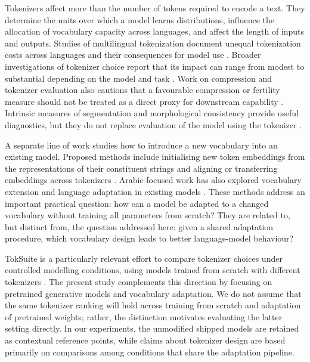 \documentclass[a4paper,fleqn]{cas-sc}
\begin{document}
Tokenizers affect more than the number of tokens required to encode a text. They determine the units over which a model learns distributions, influence the allocation of vocabulary capacity across languages, and affect the length of inputs and outputs. Studies of multilingual tokenization document unequal tokenization costs across languages and their consequences for model use \citep{rust2021good,petrov2023language}. Broader investigations of tokenizer choice report that its impact can range from modest to substantial depending on the model and task \citep{ali2024tokenizer,dagan2024getting,alqahtani2026stop}. Work on compression and tokenizer evaluation also cautions that a favourable compression or fertility measure should not be treated as a direct proxy for downstream capability \citep{goldman2024unpacking,schmidt2024tokenization,lotz2025beyond}. Intrinsic measures of segmentation and morphological consistency provide useful diagnostics, but they do not replace evaluation of the model using the tokenizer \citep{batsuren2024evaluating,uzan2024greed}.

A separate line of work studies how to introduce a new vocabulary into an existing model. Proposed methods include initialising new token embeddings from the representations of their constituent strings and aligning or transferring embeddings across tokenizers \citep{minixhofer2022wechsel,dobler2023focus,mundra2024empirical,li2025tokalign,goddard2025training}. Arabic-focused work has also explored vocabulary extension and language adaptation in existing models \citep{bari2025allam,zhu2025second,kashirskiy2025aratoken}. These methods address an important practical question: how can a model be adapted to a changed vocabulary without training all parameters from scratch? They are related to, but distinct from, the question addressed here: given a shared adaptation procedure, which vocabulary design leads to better language-model behaviour?

TokSuite is a particularly relevant effort to compare tokenizer choices under controlled modelling conditions, using models trained from scratch with different tokenizers \citep{altintas2025toksuite}. The present study complements this direction by focusing on pretrained generative models and vocabulary adaptation. We do not assume that the same tokenizer ranking will hold across training from scratch and adaptation of pretrained weights; rather, the distinction motivates evaluating the latter setting directly. In our experiments, the unmodified shipped models are retained as contextual reference points, while claims about tokenizer design are based primarily on comparisons among conditions that share the adaptation pipeline.
\end{document}
